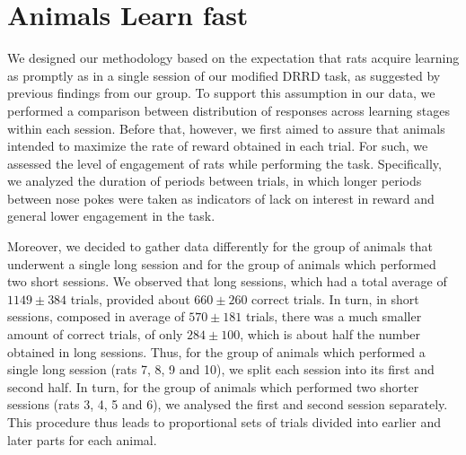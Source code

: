 \chapter{Animals Learn fast}
\label{chap:learning}

We designed our methodology based on the expectation that rats acquire learning as promptly as in a single session of our modified DRRD task, as suggested by previous findings from our group. To support this assumption in our data, we performed a comparison between distribution of responses across learning stages within each session. Before that, however, we first aimed to assure that animals intended to maximize the rate of reward obtained in each trial. For such, we assessed the level of engagement of rats while performing the task. Specifically, we analyzed the duration of periods between trials, in which longer periods between nose pokes were taken as indicators of lack on interest in reward and general lower engagement in the task.

Moreover, we decided to gather data differently for the group of animals that underwent a single long session and for the group of animals which performed two short sessions. We observed that long sessions, which had a total average of $1149 \pm 384$ trials, provided about $660 \pm 260$ correct trials. In turn, in short sessions, composed in average of $570 \pm 181$ trials, there was a much smaller amount of correct trials, of only $284\pm 100$, which is about half the number obtained in long sessions. Thus, for the group of animals which performed a single long session (rats 7, 8, 9 and 10), we split each session into its first and second half. In turn, for the group of animals which performed two shorter sessions (rats 3, 4, 5 and 6), we analysed the first and second session separately. This procedure thus leads to proportional sets of trials divided into earlier and later parts for each animal.


